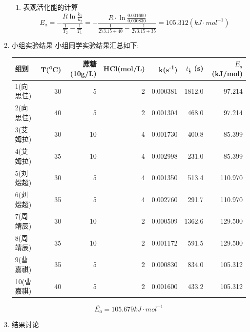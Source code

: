 \documentclass[11pt]{report}
\def \qt {t_{\frac{1}{2}}}
\begin{document}
\begin{enumerate}
\begin{enumerate}
\item 表观活化能的计算
\label{sec:org7594772}
\[
E_{a}=-\frac{R\ln \frac{k_{1}}{k_{2}}}{\frac{1}{T_{2}}-\frac{1}{T_{1}}}=-\frac{R\cdot \ln\frac{0.001600}{0.000830}}{\frac{1}{273.15+40}-\frac{1}{273.15+35}}=105.312(kJ\cdot mol^{-1})
\]
\end{enumerate}
\item 小组实验结果
\label{sec:org1d1d42f}
小组同学实验结果汇总如下:
\begin{center}
\begin{tabular}{lrrrrrr}
组别 & T(\textsuperscript{o}C) & 蔗糖(10g/L) & HCl(mol/L) & k(s\textsuperscript{-1}) & \(\qt\) (s) & \(E_{a}\) (kJ/mol)\\
\hline
1(向思佳) & 30 & 5 & 2 & 0.000381 & 1812.0 & 97.214\\
2(向思佳) & 40 & 5 & 2 & 0.001304 & 468.0 & 97.214\\
3(艾姆拉) & 30 & 10 & 4 & 0.001730 & 400.8 & 85.399\\
4(艾姆拉) & 35 & 10 & 4 & 0.002998 & 231.0 & 85.399\\
5(刘煜超) & 30 & 5 & 4 & 0.001350 & 513.4 & 110.970\\
6(刘煜超) & 35 & 5 & 4 & 0.002760 & 291.7 & 110.970\\
7(周靖辰) & 30 & 10 & 2 & 0.000509 & 1362.6 & 129.500\\
8(周靖辰) & 35 & 10 & 2 & 0.001172 & 591.5 & 129.500\\
9(曹嘉祺) & 35 & 5 & 2 & 0.000830 & 834.0 & 105.312\\
10(曹嘉祺) & 40 & 5 & 2 & 0.001600 & 433.2 & 105.312\\
\end{tabular}
\end{center}
\[
\overline{E_{a}}=105.679kJ\cdot mol^{-1}
\]

\item 结果讨论
\label{sec:org4eef8ca}


\end{enumerate}
\end{document}
